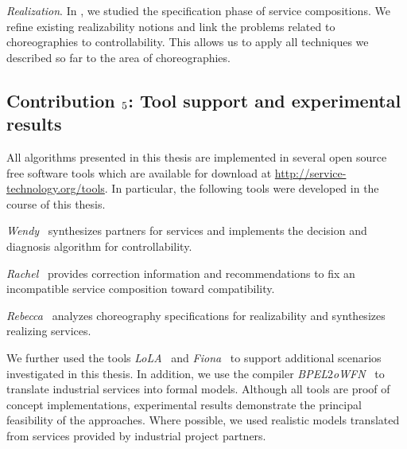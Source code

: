 \begin{niceitemize}
\item \emph{Realization}.
In \cite{LohmannW_2009_wsfm}, we studied the specification phase of service compositions. We refine existing realizability notions and link the problems related to choreographies to controllability. This allows us to apply all techniques we described so far to the area of choreographies.
\end{niceitemize}




\subsection*{Contribution $\mathnormal{5}$: Tool support and experimental results}

All algorithms presented in this thesis are implemented in several open source free software tools which are available for download at \href{http://service-technology.org/tools}{http:/\!/service-technology.org/tools}. In particular, the following tools were developed in the course of this thesis.

\begin{niceitemize}
\item \emph{Wendy}~\cite{LohmannW_2009_wendy} synthesizes partners for services and implements the decision and diagnosis algorithm for controllability.
\item \emph{Rachel}~\cite{rachel} provides correction information and recommendations to fix an incompatible service composition toward compatibility.
\item \emph{Rebecca}~\cite{rebecca} analyzes choreography specifications for realizability and synthesizes realizing services.
\end{niceitemize}

We further used the tools \emph{LoLA}~\cite{Wolf_2007_icatpn} and \emph{Fiona}~\cite{MassutheW_2008_awpn} to support additional scenarios investigated in this thesis. In addition, we use the compiler \emph{BPEL$\mathit{2}$oWFN}~\cite{Lohmann_2007_hubtr212} to translate industrial services into formal models. Although all tools are proof of concept implementations, experimental results demonstrate the principal feasibility of the approaches. Where possible, we used realistic models translated from  services provided by industrial project partners.





